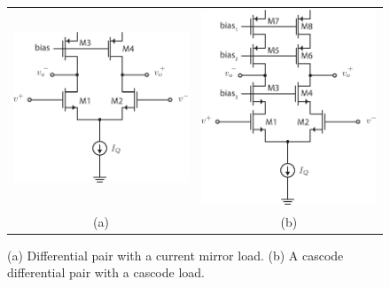 \begin{figure}[t]
\centering
\begin{tabular}{cc}
\includegraphics[scale=1.00]{Diff_mirror_load} &
\includegraphics[scale=1.00]{Diff_mirror_cascode}\\
(a) & (b)\\
\end{tabular}
\caption{(a) Differential pair with a current mirror load.  (b) A cascode differential pair with a cascode load.}
\label{fig:Diff_mirror_load}
\end{figure}
